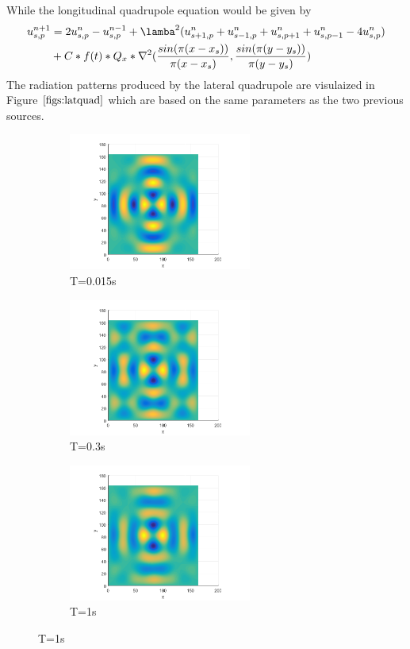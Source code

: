 While the longitudinal quadrupole equation would be given by
\begin{equation}
\label{eqn:FD5dquadlat}
	\begin{aligned}
	u^{n+1}_{s,p}&=2u^{n}_{s,p}-u^{n-1}_{s,p}+\lamba^{2}(u^{n}_{s+1,p}+u^{n}_{s-1,p}+u^{n}_{s,p+1}+u^{n}_{s,p-1}-4u^{n}_{s,p}) \\
			&+ C*f(t)*Q_{x}*\nabla^{2}(\frac{sin(\pi(x-x_{s}))}{\pi(x-x_{s})},\frac{sin(\pi(y-y_{s}))}{\pi(y-y_{s})})
	\end{aligned}
\end{equation}
The radiation patterns produced by the lateral quadrupole are visulaized in Figure $\ref{figs:latquad}$ which are based on the same parameters as the two previous sources.
\begin{figure}[h]
\begin{subfigure}{0.3 \textwidth}
	\centering
	\includegraphics[width=6cm]{../Chapter_4/_Figs/Quadrupole_lateral_001_5point_160Hz_L10m_8000Fs.png}
	\caption{T=0.015s}
\end{subfigure}
\begin{subfigure}{0.3 \textwidth}
	\centering
	\includegraphics[width=6cm]{../Chapter_4/_Figs/Quadrupole05_lateral_5point_160Hz_L10m_8000Fs.png}
	\caption{T=0.3s}
\end{subfigure}
\begin{subfigure}{0.3 \textwidth}
	\centering
	\includegraphics[width=6cm]{../Chapter_4/_Figs/Quadrupole1_lateral_5point_160Hz_L10m_8000Fs.png}
	\caption{T=1s}
\end{subfigure}
\label{figs:latquad}
\end{figure}



